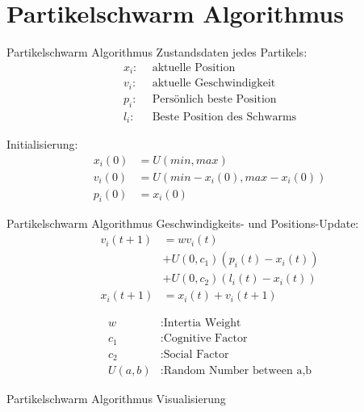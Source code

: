 \section[Algorithmus]{Partikelschwarm Algorithmus}
\begin{frame}{Partikelschwarm Algorithmus}
	Zustandsdaten jedes Partikels:
	\begin{align*}
		x_i: \: \: & \text{aktuelle Position}\\
		v_i: \: \: & \text{aktuelle Geschwindigkeit}\\
		p_i: \: \: & \text{Persönlich beste Position} \\
		l_i: \: \: & \text{Beste Position des Schwarms}
	\end{align*}
	

	Initialisierung:
	\begin{align*}
		x_i(0) &= U(min,max) \\
		v_i(0) &= U(min - x_i(0), max - x_i(0)) \\
		p_i(0) &= x_i(0)
	\end{align*}
	
\end{frame}

\begin{frame}{Partikelschwarm Algorithmus}
	Geschwindigkeits- und Positions-Update:
	\begin{align*}
		v_i(t+1) &= w v_i(t) \\
				&+ U(0,c_1) \left(p_i(t)-x_i(t) \right) \\
				&+ U(0,c_2) \left(l_i(t)-x_i(t) \right) \\
		x_{i}(t+1) &= x_i(t) + v_i(t+1)
	\end{align*}

	\begin{align*}
		w &: \text{Intertia Weight} \\
		c_1 &: \text{Cognitive Factor} \\
		c_2 &: \text{Social Factor} \\
		U(a,b) &: \text{Random Number between a,b}
	\end{align*}	
\end{frame}

\begin{frame}{Partikelschwarm Algorithmus}
	Visualisierung
	\begin{figure}[htbp]
		
	\end{figure}
\end{frame}